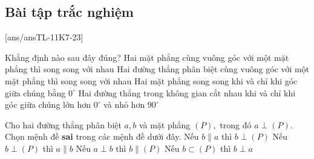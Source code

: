 \subsection{Bài tập trắc nghiệm}
[ans/ansTL-11K7-23]
\begin{ex}%
	Khẳng định nào sau đây đúng?
	\choice
	{Hai mặt phẳng cùng vuông góc với một mặt phẳng thì song song với nhau}
	{\True Hai đường thẳng phân biệt cùng vuông góc với một mặt phẳng thì song song với nhau}
	{Hai mặt phẳng song song khi và chỉ khi góc giữa chúng bằng $0^\circ$}
	{Hai đường thẳng trong không gian cắt nhau khi và chỉ khi góc giữa chúng lớn hơn $0^\circ$ và nhỏ hơn $90^\circ$}
\end{ex}
\begin{ex}%
	Cho hai đường thẳng phân biệt $a, b$ và mặt phẳng $(P),$ trong đó $a\perp (P).$ Chọn mệnh đề \textbf{sai} trong các mệnh đề dưới đây.
	\choice
	{Nếu $b\parallel a$ thì $b\perp (P)$}
	{Nếu $b\perp (P)$ thì $a\parallel b$}
	{\True Nếu $a\perp b$ thì $b\parallel (P)$}
	{Nếu $b\subset (P)$ thì $b\perp a$}
\end{ex}
